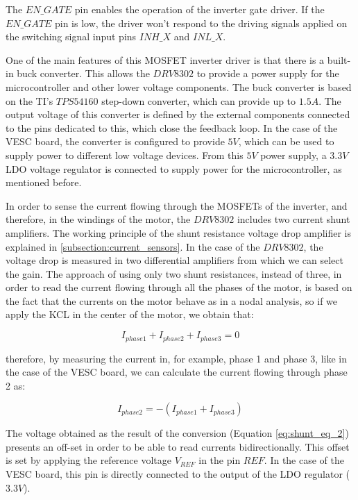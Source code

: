 The $EN\_GATE$ pin enables the operation of the inverter gate driver. If the $EN\_GATE$ pin is low, the driver won't respond to the driving signals applied on the switching signal input pins $INH\_X$ and $INL\_X$.

One of the main features of this \ac{MOSFET} inverter driver is that there is a built-in buck converter. This allows the $DRV8302$ to provide a power supply for the microcontroller and other lower voltage components. The buck converter is based on the \ac{TI}'s $TPS54160$ step-down converter, which can provide up to $1.5A$. The output voltage of this converter is defined by the external components connected to the pins dedicated to this, which close the feedback loop. In the case of the VESC board, the converter is configured to provide $5V$, which can be used to supply power to different low voltage devices. From this $5V$ power supply, a $3.3V$ \ac{LDO} voltage regulator is connected to supply power for the microcontroller, as mentioned before.

In order to sense the current flowing through the \ac{MOSFET}s of the inverter, and therefore, in the windings of the motor, the $DRV8302$ includes two current shunt amplifiers. The working principle of the shunt resistance voltage drop amplifier is explained in \ref{subsection:current_sensors}. In the case of the $DRV8302$, the voltage drop is measured in two differential amplifiers from which we can select the gain. The approach of using only two shunt resistances, instead of three, in order to read the current flowing through all the phases of the motor, is based on the fact that the currents on the motor behave as in a nodal analysis, so if we apply the \acf{KCL} in the center of the motor, we obtain that:

\begin{equation}
	I_{phase1} + I_{phase2} + I_{phase3} = 0
\end{equation}

\noindent
therefore, by measuring the current in, for example, phase 1 and phase 3, like in the case of the VESC board, we can calculate the current flowing through phase 2 as: 

\begin{equation} \label{eq:kcl_motor}
	I_{phase2} = - (I_{phase1} + I_{phase3})
\end{equation}

The voltage obtained as the result of the conversion (Equation \ref{eq:shunt_eq_2}) presents an off-set in order to be able to read currents bidirectionally. This offset is set by applying the reference voltage $V_{REF}$ in the pin $REF$. In the case of the VESC board, this pin is directly connected to the output of the \ac{LDO} regulator ($3.3V$).

